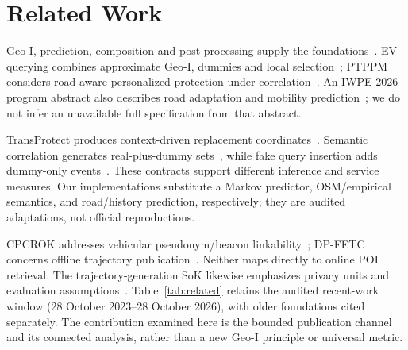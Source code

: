\section{Related Work}\label{sec:related}
Geo-I, prediction, composition and post-processing supply the
foundations~\cite{geoi,predictive,dworkroth}. EV querying combines approximate
Geo-I, dummies and local selection~\cite{ev}; PTPPM considers road-aware
personalized protection under correlation~\cite{ptppm}. An IWPE 2026 program
abstract also describes road adaptation and mobility prediction~\cite{iwpe26};
we do not infer an unavailable full specification from that abstract.

TransProtect produces context-driven replacement coordinates~\cite{transprotect}.
Semantic correlation generates real-plus-dummy sets~\cite{semantic}, while fake
query insertion adds dummy-only events~\cite{fake}. These contracts support
different inference and service measures. Our implementations substitute a
Markov predictor, OSM/empirical semantics, and road/history prediction,
respectively; they are audited adaptations, not official reproductions.

CPCROK addresses vehicular pseudonym/beacon linkability~\cite{cpcrok};
DP-FETC concerns offline trajectory publication~\cite{dpfetc}. Neither maps
directly to online POI retrieval. The trajectory-generation SoK likewise
emphasizes privacy units and evaluation assumptions~\cite{sok}.
Table~\ref{tab:related} retains the audited recent-work window
(28 October 2023--28 October 2026), with older foundations cited separately.
The contribution examined here is the bounded publication channel and its
connected analysis, rather than a new Geo-I principle or universal metric.

